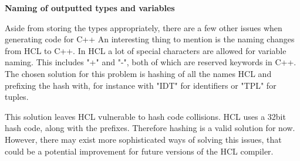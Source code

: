 \textbf{Naming of outputted types and variables}

Aside from storing the types appropriately, there are a few other issues when generating code for C++
An interesting thing to mention is the naming changes from HCL to C++.
In HCL a lot of special characters are allowed for variable naming. 
This includes "+" and "-", both of which are reserved keywords in C++.
The chosen solution for this problem is hashing of all the names HCL and prefixing the hash with, for instance with "IDT" for identifiers or "TPL" for tuples.

This solution leaves HCL vulnerable to hash code collisions.
HCL uses a 32bit hash code, along with the prefixes.
Therefore hashing is a valid solution for now.
However, there may exist more sophisticated ways of solving this issues, that could be a potential improvement for future versions of the HCL compiler. 
